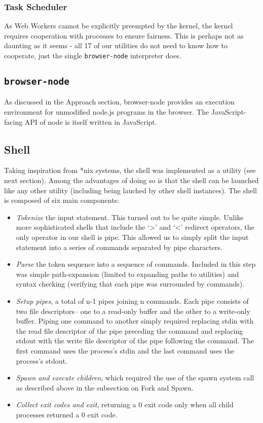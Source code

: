 \documentclass{acm_proc_article-sp}
\begin{document}
\subsubsection{Task Scheduler}

As Web Workers cannot be explicitly preempted by the kernel, the
kernel requires cooperation with processes to ensure fairness.  This
is perhaps not as daunting as it seems - all 17 of our utilities do
not need to know how to cooperate, just the single
\texttt{browser-node} interpreter does.

\subsection{\texttt{browser-node}}

As discussed in the Approach section, browser-node provides an
execution environment for unmodified node.js programs in the browser.
The JavaScript-facing API of node is itself written in JavaScript.

\subsection{Shell}

Taking inspiration from *nix systems, the shell was implemented as a
utility (see next section).  Among the advantages of doing so is that
the shell can be launched like any other utility (including being lauched
by other shell instances).  The shell is composed of six main components:
\begin{itemize}
\item \emph{Tokenize} the input statement. This turned out to be quite
  simple. Unlike more sophisticated shells that include the `>' and `<'
  redirect operators, the only operator in our shell is pipe. This allowed
  us to simply split the input statement into a series of commands separated
  by pipe characters.
\item \emph{Parse} the token sequence into a sequence of commands.
  Included in this step was simple path-expansion (limited to expanding paths
  to utilities) and syntax checking (verifying that each pipe was surrounded
  by commands).
\item \emph{Setup pipes}, a total of n-1 pipes joining n commands. Each pipe consists
  of two file descriptors-- one to a read-only buffer and the other to a
  write-only buffer.  Piping one command to another simply required replacing stdin with
  the read file descriptor of the pipe preceding the command and replacing stdout with the
  write file descriptor of the pipe following the command.  The first command uses the
  process's stdin and the last command uses the process's stdout.
\item \emph{Spawn and execute children}, which required the use of the spawn system call
  as described above in the subsection on Fork and Spawn.
\item \emph{Collect exit codes and exit}, returning a 0 exit code only when all child
  processes returned a 0 exit code.
\end{itemize}
\end{document}

